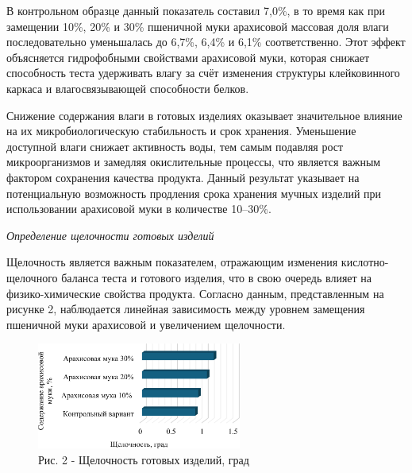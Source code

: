 \begin{multicols}{2}
В контрольном образце данный показатель составил 7,0\%, в то время как
при замещении 10\%, 20\% и 30\% пшеничной муки арахисовой массовая доля
влаги последовательно уменьшалась до 6,7\%, 6,4\% и 6,1\%
соответственно. Этот эффект объясняется гидрофобными свойствами
арахисовой муки, которая снижает способность теста удерживать влагу за
счёт изменения структуры клейковинного каркаса и влагосвязывающей
способности белков.

Снижение содержания влаги в готовых изделиях оказывает значительное
влияние на их микробиологическую стабильность и срок хранения.
Уменьшение доступной влаги снижает активность воды, тем самым подавляя
рост микроорганизмов и замедляя окислительные процессы, что является
важным фактором сохранения качества продукта. Данный результат указывает
на потенциальную возможность продления срока хранения мучных изделий при
использовании арахисовой муки в количестве 10--30\%.

\emph{Определение щелочности готовых изделий}

Щелочность является важным показателем, отражающим изменения
кислотно-щелочного баланса теста и готового изделия, что в свою очередь
влияет на физико-химические свойства продукта. Согласно данным,
представленным на рисунке 2, наблюдается линейная зависимость между
уровнем замещения пшеничной муки арахисовой и увеличением щелочности.
\end{multicols}

\begin{figure}[H]
	\centering
	\includegraphics[width=0.6\textwidth]{media/pish/Graph_12}
	\caption*{Рис. 2 - Щелочность готовых изделий, град}
\end{figure}

